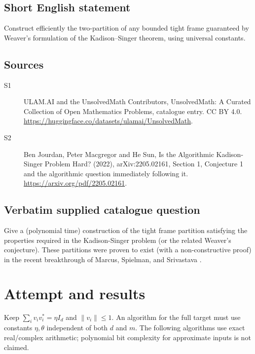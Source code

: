 \documentclass[11pt]{article}
\begin{document}
\subsection{Short English statement}
Construct efficiently the two-partition of any bounded tight frame guaranteed by Weaver’s formulation of the Kadison–Singer theorem, using universal constants.
\subsection{Sources}
\begin{description}
\item[S1] ULAM.AI and the UnsolvedMath Contributors, UnsolvedMath: A Curated Collection of Open Mathematics Problems, catalogue entry. CC BY 4.0. \url{https://huggingface.co/datasets/ulamai/UnsolvedMath}.
\item[S2] Ben Jourdan, Peter Macgregor and He Sun, Is the Algorithmic Kadison-Singer Problem Hard? (2022), arXiv:2205.02161, Section 1, Conjecture 1 and the algorithmic question immediately following it. \url{https://arxiv.org/pdf/2205.02161}.
\end{description}
\subsection{Verbatim supplied catalogue question}
Give a (polynomial time) construction of the tight frame partition satisfying the properties required in the Kadison-Singer problem (or the related Weaver’s conjecture). These partitions were proven to exist (with a non-constructive proof) in the recent breakthrough of Marcus, Spielman, and Srivastava .

\section{Attempt and results}
Keep $\sum_i v_iv_i^*=\eta I_d$ and $\|v_i\|\le1$. An algorithm for the
full target must use constants $\eta,\theta$ independent of both $d$ and $m$.
The following algorithms use exact real/complex arithmetic; polynomial bit
complexity for approximate inputs is not claimed.
\end{document}
